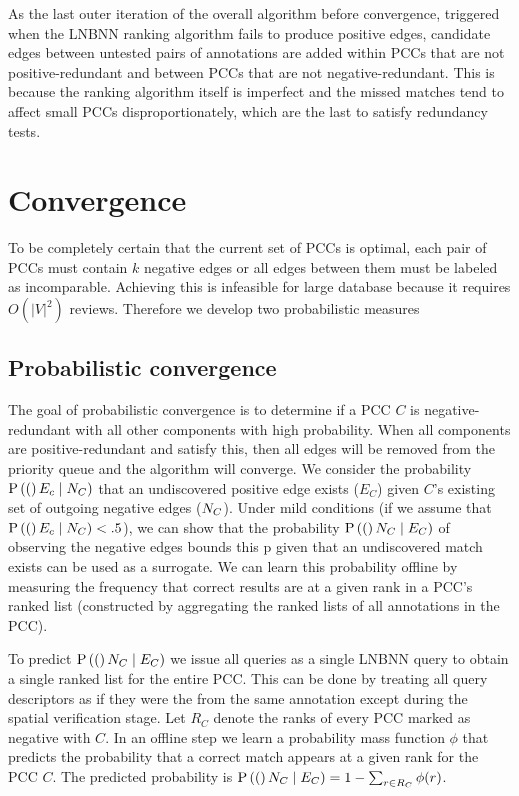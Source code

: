 As the last outer iteration of the overall algorithm before convergence, triggered when the LNBNN ranking algorithm
fails to produce positive edges, candidate edges between untested pairs of annotations are added within PCCs that are
not positive-redundant and between PCCs that are not negative-redundant. This is because the ranking algorithm itself is
imperfect and the missed matches tend to affect small PCCs disproportionately, which are the last to satisfy redundancy
tests.


\section{Convergence}\label{sec:coverge}

To be completely certain that the current set of PCCs is optimal, each pair of
PCCs must contain $k$ negative edges or all edges between them must be labeled
as incomparable. Achieving this is infeasible for large database because it
requires $O(|V|^2)$ reviews. Therefore we develop two probabilistic measures 


\subsection{Probabilistic convergence}
The goal of probabilistic convergence is to determine if a PCC $C$ is negative-redundant with all other components with
high probability. When all components are positive-redundant and satisfy this, then all edges will be removed from the
priority queue and the algorithm will converge. We consider the probability $\mathbin{\mathbin{\operatorname{P}}}\left((\right)E_c \mid N_C)$ that an undiscovered
positive edge exists ($E_C$) given $C$'s existing set of outgoing negative edges ($N_C$). Under mild conditions (if we
assume that $\mathbin{\mathbin{\operatorname{P}}}\left((\right)E_c \mid N_C) < .5$), we can show that the probability $\mathbin{\mathbin{\operatorname{P}}}\left((\right)N_C \mid E_C)$ of observing the
negative edges bounds this p given that an undiscovered match exists can be used as a surrogate. We can learn this
probability offline by measuring the frequency that correct results are at a given rank in a PCC's ranked list
(constructed by aggregating the ranked lists of all annotations in the PCC).

To predict $\mathbin{\mathbin{\operatorname{P}}}\left((\right)N_C \mid E_C)$ we issue all queries as a single LNBNN query to obtain a single ranked list for the
entire PCC. This can be done by treating all query descriptors as if they were the from the same annotation except
during the spatial verification stage. Let $R_C$ denote the ranks of every PCC marked as negative with $C$. In an
offline step we learn a probability mass function $\phi$ that predicts the probability that a correct match appears at a
given rank for the PCC $C$. The predicted probability is %
$\mathbin{\mathbin{\operatorname{P}}}\left((\right)N_C \mid E_C) = 1 - \sum_{r \in R_C} \phi(r)$.

